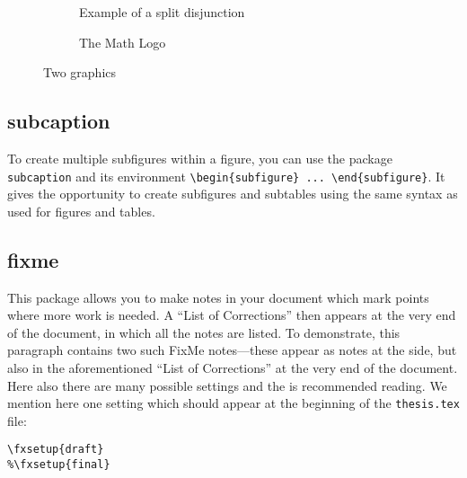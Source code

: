 \begin{figure}[htb]
\begin{subfigure}[b]{9cm}
  \caption{Example of a split disjunction}
  \label{fig:split-disjunction}
\end{subfigure}
\qquad
\begin{subfigure}[b]{4cm}
	\centering
  \caption{The Math Logo}
  \label{fig:logo}
\end{subfigure}
\caption{Two graphics}
\label{fig:graphics}
\end{figure}

\subsection{subcaption}
\label{sec:intro:subcaption}
To create multiple subfigures within a figure, you can use the package \texttt{subcaption} and its environment \verb|\begin{subfigure} ... \end{subfigure}|. It gives the opportunity to create subfigures and subtables using the same syntax as used for figures and tables.


\subsection{fixme}
\label{sec:intro:fixme}

This package allows you to make notes in your document which mark points where more work is needed. A \enquote{List of Corrections} then appears at the very end of the document, in which all the notes are listed. To demonstrate, this paragraph contains two such FixMe notes---these appear as notes at the side, but also in the aforementioned \enquote{List of Corrections} at the very end of the document. Here also there are many possible settings and the  is recommended reading. We mention here one setting which should appear at the beginning of the \texttt{thesis.tex} file:
\begin{lstlisting}[language={[LaTeX]TeX}]
%FixMe-Status: final (no FixMe notes) or draft (notes visible)
\fxsetup{draft}
%\fxsetup{final}
\end{lstlisting}



